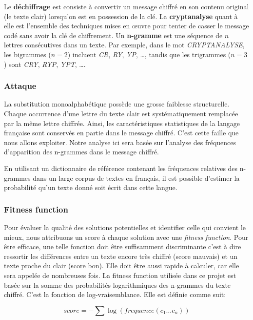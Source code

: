 \documentclass[a4paper]{article}
\begin{document}
Le \textbf{déchiffrage} est consiste à convertir un message chiffré en son contenu original (le texte clair) lorsqu'on est en possession de la clé.
La \textbf{cryptanalyse} quant à elle est l'ensemble des techniques mises en œuvre pour tenter de casser le message codé sans avoir la clé de chiffrement.
Un \textbf{n-gramme} est une séquence de $n$ lettres consécutives dans un texte.
Par exemple, dans le mot \textit{CRYPTANALYSE}, les bigrammes ($n=2$) incluent \textit{CR}, \textit{RY}, \textit{YP}, \ldots, tandis que les trigrammes ($n=3$) sont \textit{CRY}, \textit{RYP}, \textit{YPT}, \ldots.  


\subsubsection{Attaque}

La substitution monoalphabétique possède une grosse faiblesse structurelle. Chaque occurrence d’une lettre du texte clair est systématiquement remplacée par la même lettre chiffrée. Ainsi, les caractéristiques statistiques de la langage française sont conservés en partie dans le message chiffré.  
C'est cette faille que nous allons exploiter.
Notre analyse ici sera basée sur l’analyse des fréquences d’apparition des n-grammes dans le message chiffré.

En utilisant un dictionnaire de référence contenant les fréquences relatives des n-grammes dans un large corpus de textes en français, il est possible d’estimer la probabilité qu’un texte donné soit écrit dans cette langue.

\subsubsection{Fitness function}

Pour évaluer la qualité des solutions potentielles et identifier celle qui convient le mieux, nous attribuons un score à chaque solution avec une \textit{fitness function}.
Pour être efficace, une telle fonction doit être suffisamment discriminante c'est à dire ressortir les différences entre un texte encore très chiffré (score mauvais) et un texte proche du clair (score bon). Elle doit être aussi rapide à calculer, car elle sera appelée de nombreuses fois.   
La fitness function utilisée dans ce projet est basée sur la somme des probabilités logarithmiques des n-grammes du texte chiffré. C’est la fonction de log-vraisemblance. Elle est définie comme suit:

\[
score = - \sum \log(frequence(c_1 \ldots c_n))
\]
\end{document}
